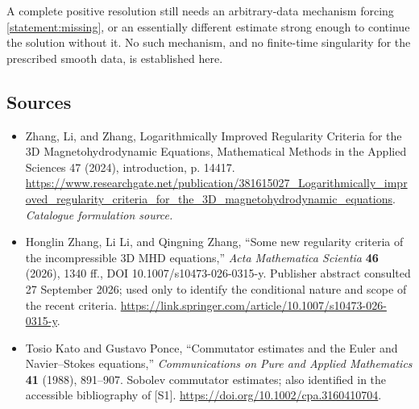 \documentclass[11pt,a4paper]{article}
\numberwithin{equation}{section}
\begin{document}
A complete positive resolution still needs an arbitrary-data mechanism
forcing \eqref{statement:missing}, or an essentially different estimate strong
enough to continue the solution without it. No such mechanism, and no
finite-time singularity for the prescribed smooth data, is established here.
\subsection{Sources}
\begin{itemize}\raggedright
\item[\textnormal{[S1]}]\hypertarget{source:statement:1}{} Zhang, Li, and Zhang, Logarithmically Improved Regularity Criteria for the 3D Magnetohydrodynamic Equations, Mathematical Methods in the Applied Sciences 47 (2024), introduction, p. 14417.
\url{https://www.researchgate.net/publication/381615027_Logarithmically_improved_regularity_criteria_for_the_3D_magnetohydrodynamic_equations}.
{\small\textit{Catalogue formulation source.}}
\item[\textnormal{[E1]}]\hypertarget{extra:statement:1}{}
Honglin Zhang, Li Li, and Qingning Zhang, ``Some new regularity criteria
of the incompressible 3D MHD equations,'' \emph{Acta Mathematica Scientia}
\textbf{46} (2026), 1340 ff., DOI 10.1007/s10473-026-0315-y.
Publisher abstract consulted 27 September 2026; used only to identify the
conditional nature and scope of the recent criteria.
\url{https://link.springer.com/article/10.1007/s10473-026-0315-y}.
\item[\textnormal{[E2]}]\hypertarget{extra:statement:2}{}
Tosio Kato and Gustavo Ponce, ``Commutator estimates and the Euler and
Navier--Stokes equations,'' \emph{Communications on Pure and Applied
Mathematics} \textbf{41} (1988), 891--907. Sobolev commutator estimates;
also identified in the accessible bibliography of [S1].
\url{https://doi.org/10.1002/cpa.3160410704}.
\end{itemize}
\end{document}
